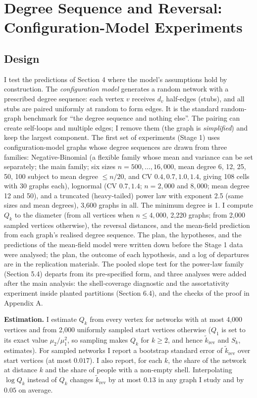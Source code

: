 \documentclass{nws}
\begin{document}
\section{Degree Sequence and Reversal: Configuration-Model Experiments}

\subsection{Design}

I test the predictions of Section 4 where the model's assumptions hold by
construction. The \emph{configuration model} generates a random network with a prescribed degree sequence: each vertex $v$ receives $d_v$ half-edges (stubs), and all stubs are paired uniformly at random to form edges. It is the standard random-graph benchmark for ``the degree sequence and nothing else''. The pairing can create self-loops and multiple edges; I remove them (the graph is \emph{simplified}) and keep the largest component. The first set of experiments (Stage 1) uses configuration-model graphs whose degree sequences are
drawn from three families: Negative-Binomial (a flexible family whose mean and variance can be set separately; the main family; six sizes
$n=500,\ldots,16{,}000$, mean degree 6, 12, 25, 50, 100 subject to mean degree
$\le n/20$, and CV $0.4,0.7,1.0,1.4$, giving 108 cells with 30 graphs each),
lognormal (CV $0.7,1.4$; $n=2{,}000$ and $8{,}000$; mean degree 12 and 50), and a
truncated (heavy-tailed) power law with exponent 2.5 (same sizes and mean degrees), 3{,}600 graphs
in all. The minimum degree is 1. I compute $Q_k$ to the diameter (from all vertices when
$n\le4{,}000$, 2{,}220 graphs; from 2{,}000 sampled vertices otherwise), the
reversal distances, and the mean-field prediction from each graph's realised
degree sequence. The plan, the hypotheses, and the predictions of the mean-field model
were written down before the Stage 1 data were analysed; the plan, the outcome of each hypothesis, and a log of departures are in the replication materials. The pooled slope test for the power-law family (Section 5.4) departs from its pre-specified form, and three analyses were added after the main analysis: the shell-coverage diagnostic and the assortativity experiment inside planted partitions (Section 6.4), and the checks of the proof in Appendix A.

\textbf{Estimation.} I estimate $Q_k$ from every vertex for networks with at most 4{,}000 vertices
and from 2{,}000 uniformly sampled start vertices otherwise ($Q_1$ is set to its exact value
$\mu_2/\mu_1^2$, so sampling makes $Q_k$ for $k\ge2$, and hence $\tilde k_{\mathrm{rev}}$ and $S_k$, estimates). For sampled
networks I report a bootstrap standard error of $\tilde k_{\mathrm{rev}}$ over start
vertices (at most $0.017$). I also report, for each $k$, the share of the network
at distance $k$ and the share of people with a non-empty shell. Interpolating $\log Q_k$ instead of $Q_k$ changes $\tilde k_{\mathrm{rev}}$ by at most $0.13$ in any graph I study and by $0.05$ on average.
\end{document}

